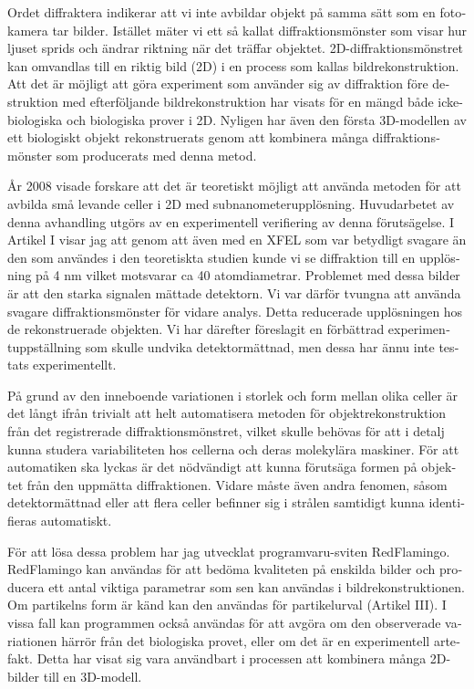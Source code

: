 \begin{otherlanguage}{swedish}
Ordet diffraktera indikerar att vi inte avbildar objekt på samma sätt som en fotokamera tar bilder. Istället mäter vi ett så kallat diffraktionsmönster som visar hur ljuset sprids och ändrar riktning när det träffar objektet. 2D-diffraktionsmönstret kan omvandlas till en riktig bild (2D) i en process som kallas bildrekonstruktion. Att det är möjligt att göra experiment som använder sig av diffraktion före destruktion med efterföljande bildrekonstruktion har visats för en mängd både icke-biologiska och biologiska prover i 2D. Nyligen har även den första 3D-modellen av ett biologiskt objekt rekonstruerats genom att kombinera många diffraktionsmönster som producerats med denna metod.

År 2008 visade forskare att det är teoretiskt möjligt att använda metoden för att avbilda små levande celler i 2D med subnanometerupplösning. Huvudarbetet av denna avhandling utgörs av en experimentell verifiering av denna förutsägelse. I Artikel I visar jag att genom att även med en XFEL som var betydligt svagare än den som användes i den teoretiskta studien kunde vi se diffraktion till en upplösning på 4 nm vilket motsvarar ca 40 atomdiametrar. Problemet med dessa bilder är att den starka signalen mättade detektorn. Vi var därför tvungna att använda svagare diffraktionsmönster för vidare analys. Detta reducerade upplösningen hos de rekonstruerade objekten. Vi har därefter föreslagit en förbättrad experimentuppställning som skulle undvika detektormättnad, men dessa har ännu inte testats experimentellt.

På grund av den inneboende variationen i storlek och form mellan olika celler är det långt ifrån trivialt att helt automatisera metoden för objektrekonstruktion från det registrerade diffraktionsmönstret, vilket skulle behövas för att i detalj kunna studera variabiliteten hos cellerna och deras molekylära maskiner. För att automatiken ska lyckas är det nödvändigt att kunna förutsäga formen på objektet från den uppmätta diffraktionen. Vidare måste även andra fenomen, såsom detektormättnad eller att flera celler befinner sig i strålen samtidigt kunna identifieras automatiskt.

För att lösa dessa problem har jag utvecklat programvaru-sviten RedFlamingo. RedFlamingo kan användas för att bedöma kvaliteten på enskilda bilder och producera ett antal viktiga parametrar som sen kan användas i bildrekonstruktionen. Om partikelns form är känd kan den användas för partikelurval (Artikel III). I vissa fall kan programmen också användas för att avgöra om den observerade variationen härrör från det biologiska provet, eller om det är en experimentell artefakt. Detta har visat sig vara användbart i processen att kombinera många 2D-bilder till en 3D-modell.


\end{otherlanguage}
